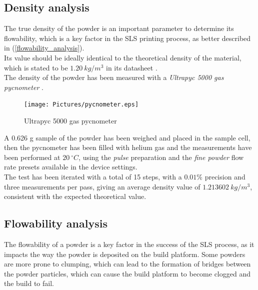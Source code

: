 \documentclass{article}
\begin{document}
        \clearpage

        \subsection{Density analysis\label{density_measurement}}
        The true density of the powder is an important parameter to determine its flowability, which is a key factor in the
        SLS printing process, as better described in (\ref{flowability_analysis}). \\
        
        Its value should be ideally identical to the theoretical density of the material, which is stated to be 
        $1.20 \ kg/m^3$ in its datasheet \autocites{GruppoMaip}. \\ 
        
        The density of the powder has been measured with a \textit{Ultrapyc 5000 gas
        pycnometer} \autocites{Ultrapyc5000}. \\ 
    
        \begin{figure}[h!]
            \centering
            \texttt{[image: Pictures/pycnometer.eps]}
            \caption{Ultrapyc 5000 gas pycnometer \autocites{Ultrapyc5000}}
            \label{fig:ultrapyc5000}
        \end{figure}
    
        A 0.626 g sample of the powder has been weighed and placed in the sample cell, then the pycnometer has been filled with 
        helium gas and the measurements have been performed at $20 \ ^{\circ}C$, using the \textit{pulse} preparation and the 
        \textit{fine powder} flow rate presets available in the device settings. \\ 
    
        The test has been iterated with a total of 15 steps, with a $0.01 \%$ precision and three measurements per pass, giving an average 
        density value of $1.213602 \ kg/m^3$, consistent with the expected theoretical value. \\ 
    
        \clearpage

        \subsection{Flowability analysis\label{flowability_analysis}}

        The flowability of a powder is a key factor in the success of the SLS process, as it impacts the way the powder is deposited
        on the build platform. Some powders are more prone to clumping, which can lead to the formation of bridges between the powder 
        particles, which can cause the build platform to become clogged and the build to fail. \\ 
\end{document}
